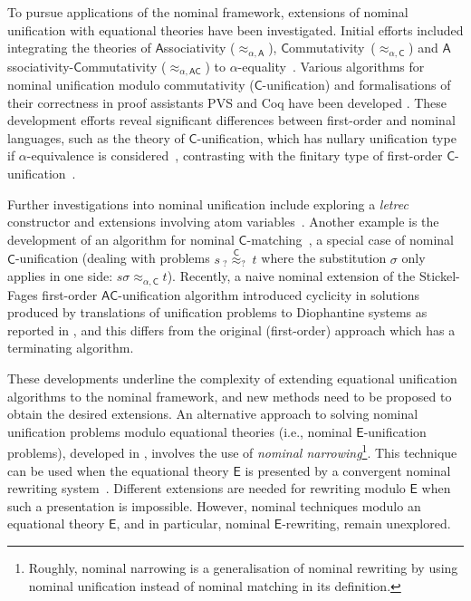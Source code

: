 \documentclass[submission,copyright,creativecommons]{eptcs}
\newcommand{\caleq}{\approx_{\alpha,\theory{C}}}
\newcommand{\theory}[1]{\ensuremath{\mathsf{#1}}}
\theoremstyle{plain}
\theoremstyle{definition}
\theoremstyle{remark}
\begin{document}
To pursue applications of the nominal framework, extensions of nominal unification with equational theories have been investigated.  Initial efforts included integrating  the theories of \theory{A}ssociativity ($\approx_{\alpha,\theory{A}}$), \theory{C}ommutativity~($\approx_{\alpha,\theory{C}}$) and \theory{A}ssociativity-\theory{C}ommutativity ($\approx_{\alpha,\theory{AC}}$) to $\alpha$-equality~\cite{A-C-AC/tcs/Ayala-RinconSFN19}. Various algorithms for nominal unification modulo commutativity ($\theory{C}$-unification) and formalisations of their correctness in proof assistants PVS and Coq have been developed \cite{lopstr:NominalC-Unif/Washington17,OnSolvingNomFPequations/frocos/Washington17,FPconstraints/Ayala-RinconFN18,FormalisingNomC-unif/mscs/Gabriel21}. These development efforts reveal significant differences between first-order and nominal languages, such as the theory of \theory{C}-unification, which has nullary unification type if $\alpha$-equivalence is considered~\cite{lopstr:NominalC-Unif/Washington17}, contrasting with the finitary type of first-order \theory{C}-unification~\cite{Baader98}. 
 
Further investigations into nominal unification include exploring a \textit{letrec} constructor and extensions involving atom variables~\cite{NomUnif/Schmidt-Schauss22}. Another example is the development of an algorithm for nominal \theory{C}-matching~\cite{AFormalisationofNomCmatching/entcs/Ayala-RinconSFN19}, a special case of nominal \theory{C}-unification (dealing with problems $s\ _?{\overset{\theory{C}}{\approx}}_?\ t$ where the substitution $\sigma$ only applies in one side:  $s\sigma\caleq t$). Recently, a naive nominal extension of the  Stickel-Fages first-order  \theory{AC}-unification algorithm introduced cyclicity in solutions produced by translations of unification problems to Diophantine systems as reported in \cite{CICM:AyalaRinconFSKN23}, and this differs from the original (first-order) approach which has a terminating algorithm.  


These developments underline the complexity of extending equational unification algorithms to the nominal framework, and new methods need to be proposed to obtain the desired extensions. An alternative approach to solving nominal unification problems modulo equational theories (i.e., nominal $\theory{E}$-unification problems), developed in \cite{NominalNarrowing16}, involves the use of {\em nominal narrowing}\footnote{Roughly, nominal narrowing is a generalisation of nominal rewriting by using nominal unification instead of nominal matching in its definition.}. This technique can be used when the equational theory $\theory{E}$ is presented by a convergent nominal rewriting system~\cite{NominalRewriting/FernandezG07,NomSyntax/fct/DominguezF19}. 
Different extensions are needed for rewriting modulo \theory{E} when such a presentation is impossible. However, nominal techniques modulo an equational theory \theory{E}, and in particular, nominal \theory{E}-rewriting, remain unexplored.
\end{document}
